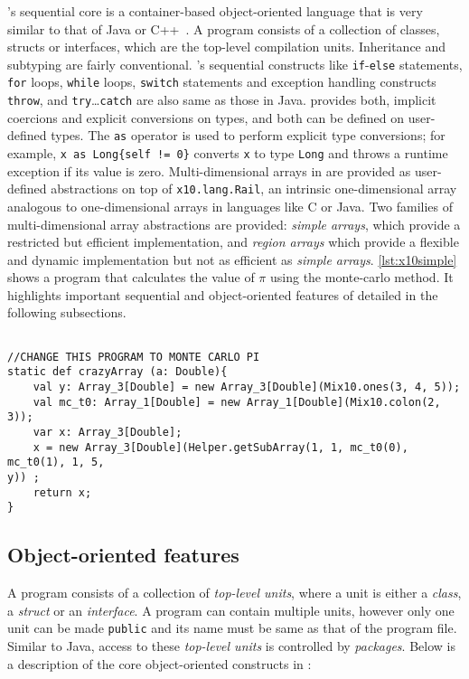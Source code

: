 \xten's sequential core is a container-based object-oriented language that is 
very similar to that of Java or C++~\cite{}. A \xten program consists of a
collection of classes, structs or interfaces, which are the top-level compilation
units. Inheritance and subtyping are fairly conventional. \xten's sequential
constructs like \texttt{if}-\texttt{else} statements, \texttt{for} loops,
\texttt{while} loops, \texttt{switch} statements and exception handling
constructs \texttt{throw}, and \texttt{try}\ldots\texttt{catch} are  also same 
as those in Java. 
\xten provides both, implicit coercions and explicit conversions on types, and 
both can
be defined on user-defined types. The \texttt{as} operator is used to perform
explicit type conversions; for example, \texttt{x as Long\{self != 0\}} converts
\texttt{x} to type \texttt{Long} and throws a runtime exception if its value is
zero. Multi-dimensional arrays in \xten are provided as user-defined abstractions on top of
\texttt{x10.lang.Rail}, an intrinsic one-dimensional array analogous to
one-dimensional arrays in languages like C or Java. Two families of
multi-dimensional array abstractions are provided: \emph{simple arrays}, which
provide
a restricted but efficient implementation, and \emph{region arrays} which
provide
a flexible and dynamic implementation but not as efficient as \emph{simple
arrays}.
\ref{lst:x10simple} shows a \xten program that calculates the value of $\pi$
using the monte-carlo method. It highlights important sequential and
object-oriented features of \xten detailed in the following subsections.

\begin{lstlisting}[caption={},label={lst:x10simple},language=x10,numbers=none]

//CHANGE THIS PROGRAM TO MONTE CARLO PI
static def crazyArray (a: Double){
    val y: Array_3[Double] = new Array_3[Double](Mix10.ones(3, 4, 5));
    val mc_t0: Array_1[Double] = new Array_1[Double](Mix10.colon(2, 3));
    var x: Array_3[Double];
    x = new Array_3[Double](Helper.getSubArray(1, 1, mc_t0(0), mc_t0(1), 1, 5,
y)) ;
    return x;
}
\end{lstlisting}

\subsection{Object-oriented features}

A program consists of a collection of \emph{top-level units}, where a unit is
either a \emph{class}, a \emph{struct} or an \emph{interface}. A program can
contain multiple units, however only one unit can be made \texttt{public} and
its name must be same as that of the program file. Similar to Java, access to
these \emph{top-level units} is controlled by \emph{packages}. Below is a
description of the core object-oriented constructs in \xten: 

